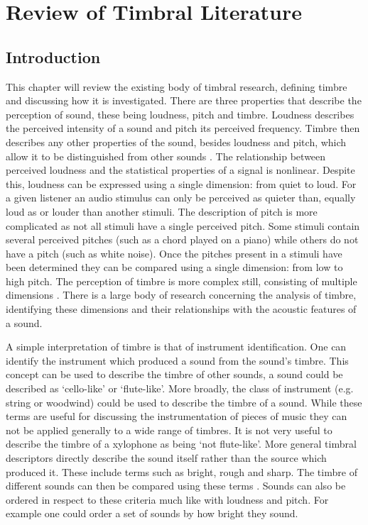 
\chapter{Review of Timbral Literature}
\label{chap:Timbre}

\section{Introduction}
\label{sec:Timbre-Introduction}
	This chapter will review the existing body of timbral research, defining timbre and discussing how it is
	investigated. There are three properties that describe the perception of sound, these being loudness, pitch and
	timbre.  Loudness describes the perceived intensity of a sound and pitch its perceived frequency. Timbre then
	describes any other properties of the sound, besides loudness and pitch, which allow it to be distinguished from
	other sounds \citep{mathews1999introduction}. The relationship between perceived loudness and the statistical
	properties of a signal is nonlinear. Despite this, loudness can be expressed using a single dimension: from quiet
	to loud. For a given listener an audio stimulus can only be perceived as quieter than, equally loud as or louder
	than another stimuli. The description of pitch is more complicated as not all stimuli have a single perceived
	pitch. Some stimuli contain several perceived pitches (such as a chord played on a piano) while others do not have
	a pitch (such as white noise). Once the pitches present in a stimuli have been determined they can be compared
	using a single dimension: from low to high pitch. The perception of timbre is more complex still, consisting of
	multiple dimensions \citep{rossing2002the}. There is a large body of research concerning the analysis of timbre,
	identifying these dimensions and their relationships with the acoustic features of a sound.

	A simple interpretation of timbre is that of instrument identification. One can identify the instrument which
	produced a sound from the sound's timbre. This concept can be used to describe the timbre of other sounds, a sound
	could be described as `cello-like' or `flute-like'. More broadly, the class of instrument (e.g. string or woodwind)
	could be used to describe the timbre of a sound. While these terms are useful for discussing the instrumentation of
	pieces of music they can not be applied generally to a wide range of timbres. It is not very useful to describe the
	timbre of a xylophone as being `not flute-like'. More general timbral descriptors directly describe the sound
	itself rather than the source which produced it. These include terms such as bright, rough and sharp. The timbre of
	different sounds can then be compared using these terms \citep{howard2009acoustics}. Sounds can also be ordered in
	respect to these criteria much like with loudness and pitch. For example one could order a set of sounds by how
	bright they sound.

